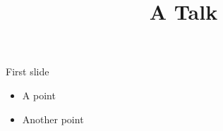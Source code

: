 \documentclass{beamer}
\title{A Talk}
\author{}
\date{}
\begin{document}
\frame{\titlepage}

\begin{frame}{First slide}
  \begin{itemize}
    \item A point
    \item Another point
  \end{itemize}
\end{frame}
\end{document}
